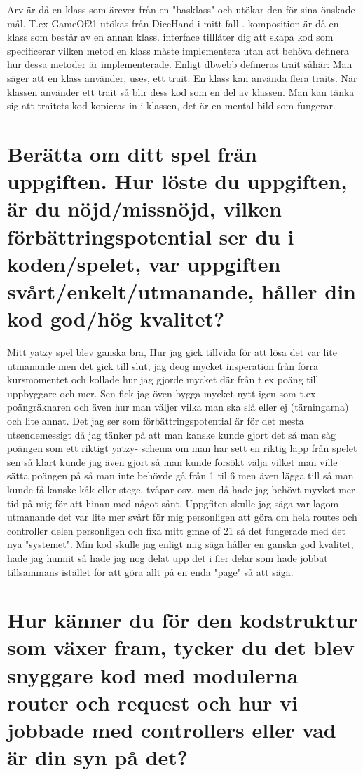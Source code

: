 \documentclass[oneside]{book}
\begin{document}
Arv är då en klass som ärever från en "basklass" och utökar den för sina önskade mål. T.ex GameOf21 utökas från DiceHand i mitt fall
. komposition är då en klass som består av en annan klass. 
interface tilllåter dig att skapa kod som specificerar vilken metod en klass måste implementera utan att behöva
definera hur dessa metoder är implementerade. Enligt dbwebb defineras trait såhär: Man säger att en klass använder,
uses, ett trait. En klass kan använda flera traits. När klassen använder ett trait så blir dess kod som en del
av klassen. Man kan tänka sig att traitets kod kopieras in i klassen, det är en mental bild som fungerar.

\section{Berätta om ditt spel från uppgiften. Hur löste du uppgiften, är du nöjd/missnöjd,
vilken förbättringspotential ser du i koden/spelet,
var uppgiften svårt/enkelt/utmanande, håller din kod god/hög kvalitet?}

Mitt yatzy spel blev ganska bra, Hur jag gick tillvida för att lösa det var lite utmanande men
det gick till slut, jag deog mycket insperation från förra kursmomentet och kollade hur jag gjorde mycket där
från t.ex poäng till uppbyggare och mer. Sen fick jag öven bygga mycket nytt igen som t.ex poängräknaren
och även hur man väljer vilka man ska slå eller ej (tärningarna) och lite annat. Det jag ser som förbättringspotential
är för det mesta utsendemessigt då jag tänker på att man kanske kunde gjort det så man såg poängen som ett riktigt yatzy-
schema om man har sett en riktig lapp från spelet sen så klart kunde jag även gjort så man kunde försökt välja vilket man 
ville sätta poängen på så man inte behövde gå från 1 til 6 men även lägga till så man kunde få kanske kåk eller stege, tvåpar
osv. men då hade jag behövt myvket mer tid på mig för att hinan med något sånt. 
Uppgfiten skulle jag säga var lagom utmanande det var lite mer svårt för mig personligen att göra om hela routes och controller
delen personligen och fixa mitt gmae of 21 så det fungerade med det nya "systemet". Min kod skulle jag enligt mig säga håller
en ganska god kvalitet, hade jag hunnit så hade jag nog delat upp det i fler delar som hade jobbat tillsammans istället för att
göra allt på en enda "page" så att säga.

\section{Hur känner du för den kodstruktur som växer fram, tycker du det blev snyggare kod med modulerna router och request
och hur vi jobbade med controllers eller vad är din syn på det?}
\end{document}
